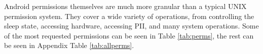 Android permissions themselves are much more granular than a typical UNIX permission system. They cover a wide variety of operations, from controlling the sleep state, accessing hardware, accessing PII, and many system operations. Some of the most requested permissions can be seen in Table \ref{tab:perms}, the rest can be seen in Appendix Table \ref{tab:allperms}.






